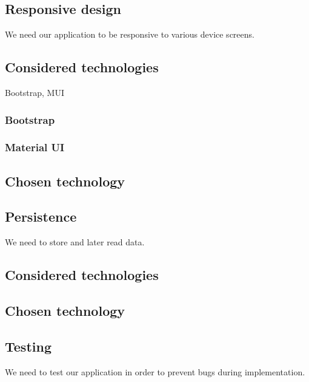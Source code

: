 \subsection{Responsive design}
We need our application to be responsive to various device screens.

\subsection*{Considered technologies}
Bootstrap, MUI
\subsubsection*{Bootstrap}

\subsubsection*{Material UI}

\subsection*{Chosen technology}



\subsection{Persistence}
We need to store and later read data.
\subsection*{Considered technologies}

\subsubsection*{}

\subsubsection*{}

\subsection*{Chosen technology}

\subsection{Testing}
We need to test our application in order to prevent bugs during implementation.
